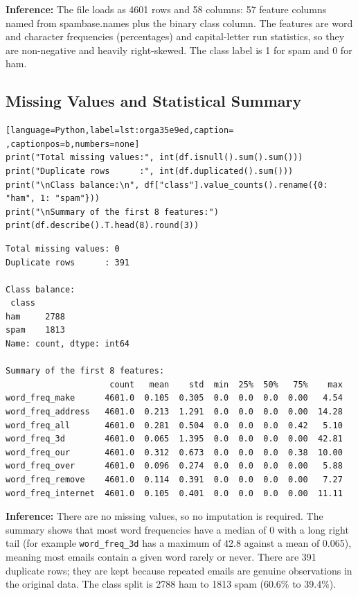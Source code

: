 \documentclass[11pt]{article}
\begin{document}
\textbf{Inference:} The file loads as 4601 rows and 58 columns: 57 feature columns named from spambase.names
plus the binary class column. The features are word and character frequencies (percentages)
and capital-letter run statistics, so they are non-negative and heavily right-skewed. The
class label is 1 for spam and 0 for ham.

\subsection*{Missing Values and Statistical Summary}
\label{sec:org33f42aa}

\begin{lstlisting}[language=Python,label=lst:orga35e9ed,caption= ,captionpos=b,numbers=none]
print("Total missing values:", int(df.isnull().sum().sum()))
print("Duplicate rows      :", int(df.duplicated().sum()))
print("\nClass balance:\n", df["class"].value_counts().rename({0: "ham", 1: "spam"}))
print("\nSummary of the first 8 features:")
print(df.describe().T.head(8).round(3))
\end{lstlisting}

\begin{verbatim}
Total missing values: 0
Duplicate rows      : 391

Class balance:
 class
ham     2788
spam    1813
Name: count, dtype: int64

Summary of the first 8 features:
                     count   mean    std  min  25%  50%   75%    max
word_freq_make      4601.0  0.105  0.305  0.0  0.0  0.0  0.00   4.54
word_freq_address   4601.0  0.213  1.291  0.0  0.0  0.0  0.00  14.28
word_freq_all       4601.0  0.281  0.504  0.0  0.0  0.0  0.42   5.10
word_freq_3d        4601.0  0.065  1.395  0.0  0.0  0.0  0.00  42.81
word_freq_our       4601.0  0.312  0.673  0.0  0.0  0.0  0.38  10.00
word_freq_over      4601.0  0.096  0.274  0.0  0.0  0.0  0.00   5.88
word_freq_remove    4601.0  0.114  0.391  0.0  0.0  0.0  0.00   7.27
word_freq_internet  4601.0  0.105  0.401  0.0  0.0  0.0  0.00  11.11
\end{verbatim}

\textbf{Inference:} There are no missing values, so no imputation is required. The summary shows that most word
frequencies have a median of 0 with a long right tail (for example \texttt{word\_freq\_3d} has a
maximum of 42.8 against a mean of 0.065), meaning most emails contain a given word rarely or
never. There are 391 duplicate rows; they are kept because repeated emails are genuine
observations in the original data. The class split is 2788 ham to 1813 spam (60.6\% to
39.4\%).
\end{document}

